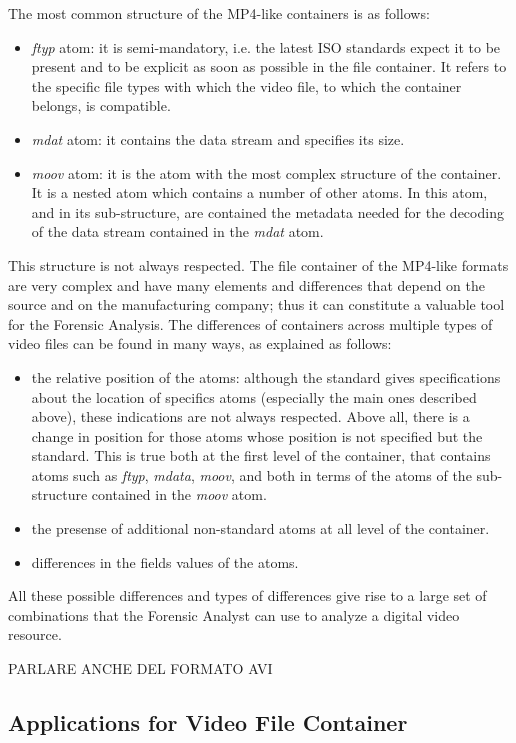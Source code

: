 The most common structure of the MP4-like containers is as follows:
\begin{itemize}
\item \emph{ftyp} atom: it is semi-mandatory, i.e. the latest ISO standards expect it to be present and to be explicit as soon as possible in the file container. It refers to the specific file types with which the video file, to which the container belongs, is compatible.
\item \emph{mdat} atom: it contains the data stream and specifies its size.
\item \emph{moov} atom: it is the atom with the most complex structure of the container. It is a nested atom which contains a number of other atoms. In this atom, and in its sub-structure, are contained the metadata needed for the decoding of the data stream contained in the \emph{mdat} atom.
\end{itemize}

This structure is not always respected. The file container of the MP4-like formats are very complex and have many elements and differences that depend on the source and on the manufacturing company; thus it can constitute a valuable tool for the Forensic Analysis.
The differences of containers across multiple types of video files can be found in many ways, as explained as follows:
\begin{itemize}
\item the relative position of the atoms: although the standard gives specifications about the location of specifics atoms (especially the main ones described above), these indications are not always respected. Above all, there is a change in position for those atoms whose position is not specified but the standard. This is true both at the first level of the container, that contains atoms such as \emph{ftyp}, \emph{mdata}, \emph{moov}, and both in terms of the atoms of the sub-structure contained in the \emph{moov} atom.
\item the presense of additional non-standard atoms at all level of the container.
\item differences in the fields values of the atoms.
\end{itemize}

All these possible differences and types of differences give rise to a large set of combinations that the Forensic Analyst can use to analyze a digital video resource.

{PARLARE ANCHE DEL FORMATO AVI}

\subsection{Applications for Video File Container}

